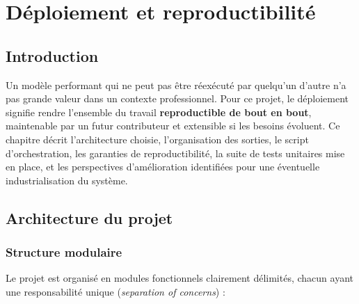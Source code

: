 \chapter{Déploiement et reproductibilité}

\section*{Introduction}

Un modèle performant qui ne peut pas être réexécuté par quelqu'un d'autre n'a pas grande
valeur dans un contexte professionnel. Pour ce projet, le déploiement signifie rendre
l'ensemble du travail \textbf{reproductible de bout en bout}, maintenable par un futur
contributeur et extensible si les besoins évoluent. Ce chapitre décrit l'architecture
choisie, l'organisation des sorties, le script d'orchestration, les garanties de
reproductibilité, la suite de tests unitaires mise en place, et les perspectives
d'amélioration identifiées pour une éventuelle industrialisation du système.

\section{Architecture du projet}

\subsection{Structure modulaire}

Le projet est organisé en modules fonctionnels clairement délimités, chacun ayant une
responsabilité unique (\textit{separation of concerns}) :

